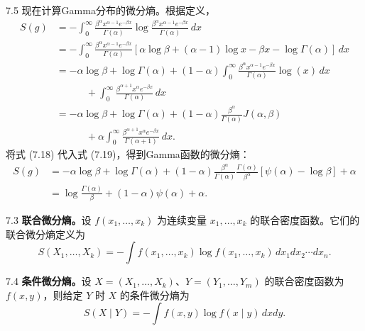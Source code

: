 \begin{bookexample}{7.5}
现在计算Gamma分布的微分熵。根据定义，
\begin{equation}
\begin{aligned}
S(g)&=-\int_0^\infty\frac{\beta^\alpha x^{\alpha-1}e^{-\beta x}}{\Gamma(\alpha)}
\log\frac{\beta^\alpha x^{\alpha-1}e^{-\beta x}}{\Gamma(\alpha)}\,dx\\
&=-\int_0^\infty\frac{\beta^\alpha x^{\alpha-1}e^{-\beta x}}{\Gamma(\alpha)}
[\alpha\log\beta+(\alpha-1)\log x-\beta x-\log\Gamma(\alpha)]\,dx\\
&=-\alpha\log\beta+\log\Gamma(\alpha)
+(1-\alpha)\int_0^\infty\frac{\beta^\alpha x^{\alpha-1}e^{-\beta x}}{\Gamma(\alpha)}\log(x)\,dx\\
&\hspace{3em}+\int_0^\infty\frac{\beta^{\alpha+1}x^\alpha e^{-\beta x}}{\Gamma(\alpha)}\,dx\\
&=-\alpha\log\beta+\log\Gamma(\alpha)+(1-\alpha)\frac{\beta^\alpha}{\Gamma(\alpha)}J(\alpha,\beta)\\
&\hspace{3em}+\alpha\int_0^\infty\frac{\beta^{\alpha+1}x^\alpha e^{-\beta x}}{\Gamma(\alpha+1)}\,dx.
\end{aligned}
\tag{7.19}
\end{equation}
将式 (7.18) 代入式 (7.19)，得到Gamma函数的微分熵：
\begin{equation}
\begin{aligned}
S(g)&=-\alpha\log\beta+\log\Gamma(\alpha)
+(1-\alpha)\frac{\beta^\alpha}{\Gamma(\alpha)}\frac{\Gamma(\alpha)}{\beta^\alpha}[\psi(\alpha)-\log\beta]+\alpha\\
&=\log\frac{\Gamma(\alpha)}\beta+(1-\alpha)\psi(\alpha)+\alpha.
\end{aligned}
\tag{7.20}
\end{equation}
\end{bookexample}

\begin{bookdefinition}{7.3}
\textbf{联合微分熵。}设 $f(x_1,\ldots,x_k)$ 为连续变量 $x_1,\ldots,x_k$ 的联合密度函数。它们的联合微分熵定义为
\begin{equation}
S(X_1,\ldots,X_k)=-\int f(x_1,\ldots,x_k)\log f(x_1,\ldots,x_k)\,dx_1dx_2\cdots dx_n.
\tag{7.21}
\end{equation}
\end{bookdefinition}

\begin{bookdefinition}{7.4}
\textbf{条件微分熵。}设 $X=(X_1,\ldots,X_k)$、$Y=(Y_1,\ldots,Y_m)$ 的联合密度函数为 $f(x,y)$，则给定 $Y$ 时 $X$ 的条件微分熵为
\begin{equation}
S(X\mid Y)=-\int f(x,y)\log f(x\mid y)\,dxdy.
\tag{7.22}
\end{equation}
\end{bookdefinition}

